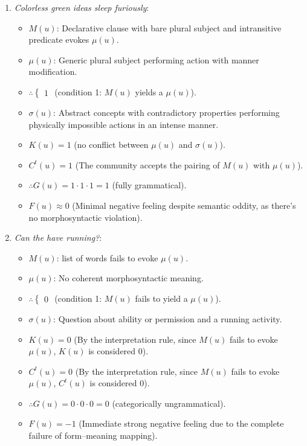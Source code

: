 \documentclass[12pt,letterpaper]{article}
\begin{document}
\begin{enumerate}
    \item \textit{Colorless green ideas sleep furiously}:
    \begin{itemize}
        \item \(M(u)\): Declarative clause with bare plural subject and intransitive predicate evokes \(\mu(u)\).
        \item \(\mu(u)\): Generic plural subject performing action with manner modification.
        \item \(\therefore \begin{cases} 1 \end{cases}\) (condition 1: \(M(u)\) yields a \(\mu(u)\)).
        \item \(\sigma(u)\): Abstract concepts with contradictory properties performing physically impossible actions in an intense manner.
        \item \(K(u) = 1\) (no conflict between \(\mu(u)\) and \(\sigma(u)\)).
        \item \(C^t(u) = 1\) (The community accepts the pairing of \(M(u)\) with \(\mu(u)\)).
        \item \(\therefore G(u) = 1 \cdot 1 \cdot 1 = 1\) (fully grammatical).
        \item \(F(u) \approx 0\) (Minimal negative feeling despite semantic oddity, as there's no morphosyntactic violation).
    \end{itemize}

    \item \textit{Can the have running?}:
    \begin{itemize}
        \item \(M(u)\): list of words fails to evoke \(\mu(u)\).
        \item \(\mu(u)\): No coherent morphosyntactic meaning.
        \item \(\therefore \begin{cases} 0 \end{cases}\) (condition 1: \(M(u)\) fails to yield a \(\mu(u)\)).
        \item \(\sigma(u)\): Question about ability or permission and a running activity.
        \item \(K(u) = 0\) (By the interpretation rule, since \(M(u)\) fails to evoke \(\mu(u)\), \(K(u)\) is considered 0).
        \item \(C^t(u) = 0\) (By the interpretation rule, since \(M(u)\) fails to evoke \(\mu(u)\), \(C^t(u)\) is considered 0).
        \item \(\therefore G(u) = 0 \cdot 0 \cdot 0 = 0\) (categorically ungrammatical).
        \item \(F(u) = -1\) (Immediate strong negative feeling due to the complete failure of form--meaning mapping).
    \end{itemize}


\end{enumerate}
\end{document}
